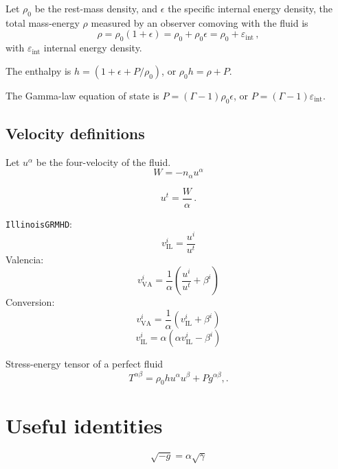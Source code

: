 \documentclass[]{scrartcl}
\begin{document}
Let $\rho_0$ be the rest-mass density, and $\epsilon$ the specific internal energy
density, the total mass-energy $\rho$ measured by an observer comoving with the
fluid is
\begin{equation}
  \label{eq:6}
  \rho = \rho_0 (1 + \epsilon) = \rho_0 + \rho_0 \epsilon = \rho_0 + \varepsilon_{\text{int}}\,,
\end{equation}
with $\varepsilon_{\text{int}}$ internal energy density.

The enthalpy is $h = (1 + \epsilon + P\slash \rho_0)$, or $\rho_0 h = \rho + P$.

The Gamma-law equation of state is $P = (\Gamma - 1) \rho_0 \epsilon$, or $P = (\Gamma - 1) \varepsilon_{\text{int}}$.


\subsection{Velocity definitions}
\label{sec:velocity-definitions}

Let $u^\alpha$ be the four-velocity of the fluid.
\begin{equation}
  \label{eq:10}
  W = -n_\alpha u^\alpha
\end{equation}

\begin{equation}
  \label{eq:7}
  u^t = \frac{W}{\alpha}\,.
\end{equation}

\texttt{IllinoisGRMHD}:
\begin{equation}
  \label{eq:13}
  v^i_{\text{IL}} = \frac{u^i}{u^t}
\end{equation}
Valencia:
\begin{equation}
  \label{eq:14}
  v^i_{\text{VA}} = \frac{1}{\alpha} \left( \frac{u^i}{u^t} + \beta^i \right)
\end{equation}
Conversion:
\begin{equation}
  \label{eq:15}
  v^i_{\text{VA}} = \frac{1}{\alpha} \left( v^i_{\text{IL}} + \beta^i \right)
\end{equation}
\begin{equation}
  \label{eq:15}
  v^i_{\text{IL}} = {\alpha} \left( \alpha v^i_{\text{IL}} - \beta^i \right)
\end{equation}

Stress-energy tensor of a perfect fluid
\begin{equation}
  \label{eq:8}
  T^{\alpha\beta} = \rho_0 h u^\alpha u^\beta + P g^{\alpha\beta},.
\end{equation}

\section{Useful identities}
\label{sec:useful-identities}

\begin{equation}
  \label{eq:3}
  \sqrt{-g} = \alpha \sqrt{\gamma}
\end{equation}
\end{document}
